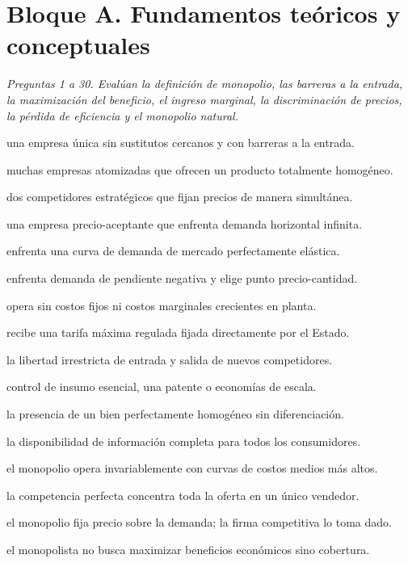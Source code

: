 \section*{Bloque A. Fundamentos teóricos y conceptuales}

\noindent\textit{Preguntas 1 a 30. Evalúan la definición de monopolio, las barreras a la entrada, la maximización del beneficio, el ingreso marginal, la discriminación de precios, la pérdida de eficiencia y el monopolio natural.}

\begin{opts}
    \item una empresa única sin sustitutos cercanos y con barreras a la entrada.
    \item muchas empresas atomizadas que ofrecen un producto totalmente homogéneo.
    \item dos competidores estratégicos que fijan precios de manera simultánea.
    \item una empresa precio-aceptante que enfrenta demanda horizontal infinita.
\end{opts}

\begin{opts}
    \item enfrenta una curva de demanda de mercado perfectamente elástica.
    \item enfrenta demanda de pendiente negativa y elige punto precio-cantidad.
    \item opera sin costos fijos ni costos marginales crecientes en planta.
    \item recibe una tarifa máxima regulada fijada directamente por el Estado.
\end{opts}

\begin{opts}
    \item la libertad irrestricta de entrada y salida de nuevos competidores.
    \item control de insumo esencial, una patente o economías de escala.
    \item la presencia de un bien perfectamente homogéneo sin diferenciación.
    \item la disponibilidad de información completa para todos los consumidores.
\end{opts}

\begin{opts}
    \item el monopolio opera invariablemente con curvas de costos medios más altos.
    \item la competencia perfecta concentra toda la oferta en un único vendedor.
    \item el monopolio fija precio sobre la demanda; la firma competitiva lo toma dado.
    \item el monopolista no busca maximizar beneficios económicos sino cobertura.
\end{opts}

